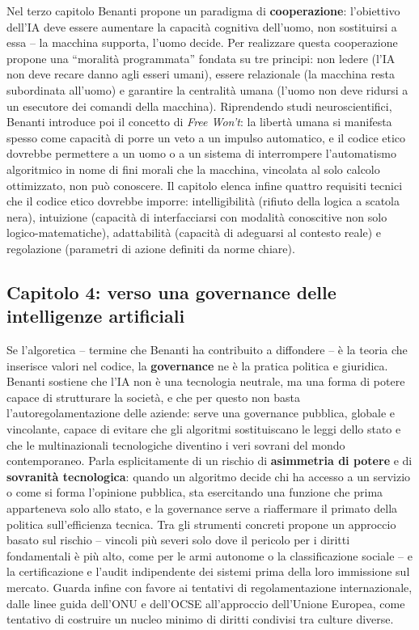 \documentclass[a4paper,11pt]{article}
\begin{document}
Nel terzo capitolo Benanti propone un paradigma di \textbf{cooperazione}: l'obiettivo dell'IA deve essere aumentare la capacità cognitiva dell'uomo, non sostituirsi a essa -- la macchina supporta, l'uomo decide. Per realizzare questa cooperazione propone una ``moralità programmata'' fondata su tre principi: non ledere (l'IA non deve recare danno agli esseri umani), essere relazionale (la macchina resta subordinata all'uomo) e garantire la centralità umana (l'uomo non deve ridursi a un esecutore dei comandi della macchina). Riprendendo studi neuroscientifici, Benanti introduce poi il concetto di \emph{Free Won't}: la libertà umana si manifesta spesso come capacità di porre un veto a un impulso automatico, e il codice etico dovrebbe permettere a un uomo o a un sistema di interrompere l'automatismo algoritmico in nome di fini morali che la macchina, vincolata al solo calcolo ottimizzato, non può conoscere. Il capitolo elenca infine quattro requisiti tecnici che il codice etico dovrebbe imporre: intelligibilità (rifiuto della logica a scatola nera), intuizione (capacità di interfacciarsi con modalità conoscitive non solo logico-matematiche), adattabilità (capacità di adeguarsi al contesto reale) e regolazione (parametri di azione definiti da norme chiare).

\subsection{Capitolo 4: verso una governance delle intelligenze artificiali}

Se l'algoretica -- termine che Benanti ha contribuito a diffondere -- è la teoria che inserisce valori nel codice, la \textbf{governance} ne è la pratica politica e giuridica. Benanti sostiene che l'IA non è una tecnologia neutrale, ma una forma di potere capace di strutturare la società, e che per questo non basta l'autoregolamentazione delle aziende: serve una governance pubblica, globale e vincolante, capace di evitare che gli algoritmi sostituiscano le leggi dello stato e che le multinazionali tecnologiche diventino i veri sovrani del mondo contemporaneo. Parla esplicitamente di un rischio di \textbf{asimmetria di potere} e di \textbf{sovranità tecnologica}: quando un algoritmo decide chi ha accesso a un servizio o come si forma l'opinione pubblica, sta esercitando una funzione che prima apparteneva solo allo stato, e la governance serve a riaffermare il primato della politica sull'efficienza tecnica. Tra gli strumenti concreti propone un approccio basato sul rischio -- vincoli più severi solo dove il pericolo per i diritti fondamentali è più alto, come per le armi autonome o la classificazione sociale -- e la certificazione e l'audit indipendente dei sistemi prima della loro immissione sul mercato. Guarda infine con favore ai tentativi di regolamentazione internazionale, dalle linee guida dell'ONU e dell'OCSE all'approccio dell'Unione Europea, come tentativo di costruire un nucleo minimo di diritti condivisi tra culture diverse.
\end{document}
